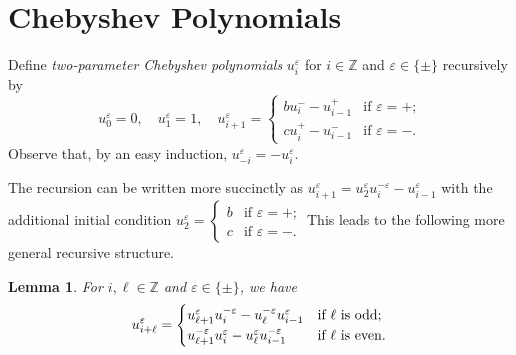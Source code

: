 \documentclass{amsart}
\newtheorem{lemma}[theorem]{Lemma}
\numberwithin{theorem}{section}
\newcommand{\ZZ}{\mathbb{Z}}
\begin{document}
\section{Chebyshev Polynomials}
  \label{sec:chebyshev}
  Define \emph{two-parameter Chebyshev polynomials} $u_i^\varepsilon$ for $i\in\ZZ$ and $\varepsilon\in\{\pm\}$ recursively by
  \[u_0^\varepsilon=0,\quad u_1^\varepsilon=1,\quad u_{i+1}^\varepsilon=\begin{cases} bu_i^- -u_{i-1}^+ & \text{if $\varepsilon=+$;}\\ cu_i^+-u_{i-1}^- & \text{if $\varepsilon=-$.} \end{cases}\]
    Observe that, by an easy induction, $u_{-i}^\varepsilon=-u_i^\varepsilon$.

  The recursion can be written more succinctly as $u_{i+1}^\varepsilon=u_2^\varepsilon u_i^{-\varepsilon}-u_{i-1}^\varepsilon$ with the additional initial condition $u_2^\varepsilon=\begin{cases} b & \text{if $\varepsilon=+$;}\\ c & \text{if $\varepsilon=-$.} \end{cases}$
  This leads to the following more general recursive structure.
  \begin{lemma}
    For $i,\ell\in\ZZ$ and $\varepsilon\in\{\pm\}$, we have
    \begin{equation}
      \label{eq:long Chebyshev recursion}
      u_{i+\ell}^\varepsilon=\begin{cases} u_{\ell+1}^\varepsilon u_i^{-\varepsilon}-u_\ell^{-\varepsilon} u_{i-1}^\varepsilon & \text{\upshape if $\ell$ is odd;}\\ u_{\ell+1}^{-\varepsilon} u_i^\varepsilon-u_\ell^\varepsilon u_{i-1}^{-\varepsilon} & \text{\upshape if $\ell$ is even.} \end{cases}
    \end{equation}
  \end{lemma}
\end{document}

